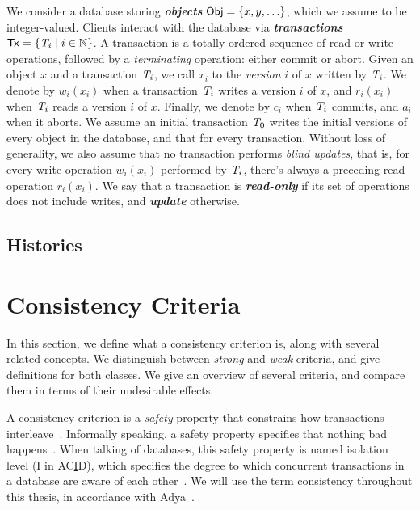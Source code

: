 We consider a database storing \textbf{\em objects} ${\sf Obj} = \{x, y, \ldots\}$, which we assume to be integer-valued. Clients interact with the database via \textbf{\em transactions} ${\sf Tx} = \{\mathit{T}_i \mid i \in \mathbb{N}\}$. A transaction is a totally ordered sequence of read or write operations, followed by a \emph{terminating} operation: either commit or abort. Given an object $x$ and a transaction $\mathit{T}_i$, we call $x_i$ to the \emph{version} $i$ of $x$ written by $\mathit{T}_i$. We denote by $w_i(x_i)$ when a transaction $\mathit{T}_i$ writes a version $i$ of $x$, and $r_i(x_i)$ when $\mathit{T}_i$ reads a version $i$ of $x$. Finally, we denote by $c_i$ when $\mathit{T}_i$ commits, and $a_i$ when it aborts. We assume an initial transaction $\mathit{T}_0$ writes the initial versions of every object in the database, and that for every transaction. Without loss of generality, we also assume that no transaction performs \emph{blind updates}, that is, for every write operation $w_i(x_i)$ performed by $\mathit{T}_i$, there's always a preceding read operation $r_i(x_i)$. We say that a transaction is \textbf{\em read-only} if its set of operations does not include writes, and \textbf{\em update} otherwise.

\subsection{Histories}



\section{Consistency Criteria}

In this section, we define what a consistency criterion is, along with several related concepts. We distinguish between \emph{strong} and \emph{weak} criteria, and give definitions for both classes. We give an overview of several criteria, and compare them in terms of their undesirable effects.

A consistency criterion is a \emph{safety} property that constrains how transactions interleave~\citep{ardekani_thesis}. Informally speaking, a safety property specifies that nothing bad happens~\citep{lamport_safety}. When talking of databases, this safety property is named isolation level (I in AC\underline{I}D), which specifies the degree to which concurrent transactions in a database are aware of each other~\citep{adya_thesis}. We will use the term consistency throughout this thesis, in accordance with Adya~\citep{adya_thesis}.

